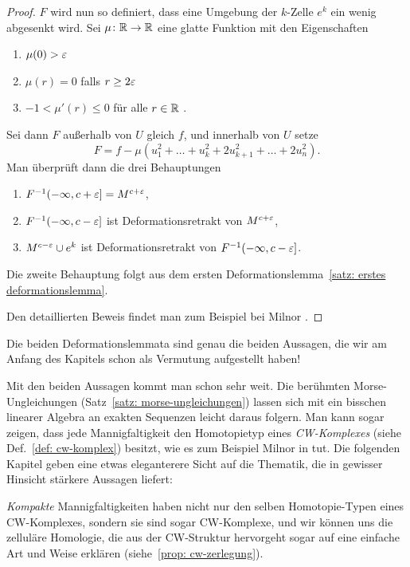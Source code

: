 \begin{proof}
    $F$ wird nun so definiert, dass eine Umgebung der $k$-Zelle $e^k$ ein wenig abgesenkt wird.
    Sei $\mu \colon { \mathbb R } \to { \mathbb R }$ eine glatte Funktion mit den Eigenschaften
    \begin{enumerate}
        \item $\mu(0) > \varepsilon$
        \item $\mu (r) = 0$ falls $r \geq 2 \varepsilon$
        \item $-1 < \mu' (r) \leq 0$ für alle $r \in { \mathbb R }$ .
    \end{enumerate}
    Sei dann $F$ außerhalb von $U$ gleich $f$, und innerhalb von $U$ setze
    \[ F = f - \mu ( u_1^2 + \dots + u_k^2 + 2 u_{k + 1}^2 + \dots + 2 u_n^2) . \]
    Man überprüft dann die drei Behauptungen
    \begin{enumerate}
        \item $F^{-1}(- \infty, c + \varepsilon] = M^{c + \varepsilon}$,
        \item $F^{-1}(- \infty, c - \varepsilon]$ ist Deformationsretrakt von $M^{c + \varepsilon}$,
        \item $M^{c - \varepsilon} \cup e^k$ ist Deformationsretrakt von $F^{-1}(- \infty, c - \varepsilon]$.
    \end{enumerate}
    Die zweite Behauptung folgt aus dem ersten 
    Deformationslemma~\ref{satz: erstes deformationslemma}.
    
    Den detaillierten Beweis findet man zum Beispiel bei Milnor \cite{milnor}.
\end{proof}

Die beiden Deformationslemmata sind genau die beiden Aussagen, die wir am Anfang des Kapitels schon
als Vermutung aufgestellt haben!

Mit den beiden Aussagen kommt man schon sehr weit. Die berühmten Morse-\-Un\-glei\-chun\-gen 
(Satz~\ref{satz: morse-ungleichungen}) lassen
sich mit ein bisschen linearer Algebra an exakten Sequenzen leicht daraus folgern. Man kann sogar
zeigen, dass jede Mannigfaltigkeit den Homotopietyp eines \textit{CW-Komplexes}
(siehe Def.~\ref{def: cw-komplex}) besitzt, wie es zum Beispiel Milnor  in \cite{milnor} tut. Die 
folgenden Kapitel geben eine etwas eleganterere Sicht auf die Thematik, die in gewisser Hinsicht 
stärkere Aussagen liefert:

\textit{Kompakte} Mannigfaltigkeiten haben nicht nur den selben Homotopie-Typen eines CW-Komplexes, 
sondern sie sind sogar CW-Komplexe, und wir können uns die zelluläre Homologie, die aus der 
CW-Struktur hervorgeht sogar auf eine einfache Art und Weise erklären 
(siehe~\ref{prop: cw-zerlegung}).